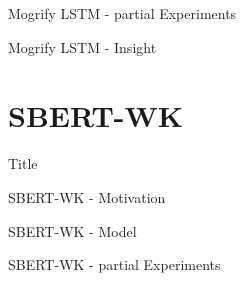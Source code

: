 \documentclass[10pt]{beamer}
\begin{document}
\begin{frame}{Mogrify LSTM - partial Experiments}

\end{frame}

\begin{frame}{Mogrify LSTM - Insight}

\end{frame}

\section{SBERT-WK}

\begin{frame}{Title}
    
\end{frame}

\begin{frame}{SBERT-WK - Motivation}
    

\end{frame}

\begin{frame}{SBERT-WK - Model}

    \begin{figure}
        \begin{center}
        \end{center}
    \end{figure}

\end{frame}

\begin{frame}{SBERT-WK - partial Experiments}

\end{frame}
\end{document}
